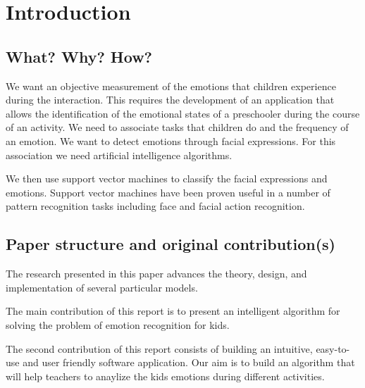 \documentclass[runningheads,a4paper,11pt]{report}
\begin{document}
\tableofcontents

\newpage

\listoftables
\listoffigures

\newpage




\newpage






\chapter{Introduction}
\label{chapter:introduction}

\section{What? Why? How?}
\label{section:what}

We want an objective measurement of the emotions that children experience during the interaction. This requires the development of an application that allows the identification of the emotional states of a preschooler during the course of an activity. We need to associate tasks that children do and the frequency of an emotion.
We want to detect emotions through facial expressions. For this association we need artificial intelligence algorithms.

We then use support vector machines to classify the facial expressions and emotions.
Support vector machines have been proven useful in a number of pattern recognition tasks including face and facial action recognition.

\section{Paper structure and original contribution(s)}
\label{section:structure}

The research presented in this paper advances the theory, design, and implementation of several particular models.

The main contribution of this report is to present an intelligent algorithm for solving the problem of emotion recognition for kids.

The second contribution of this report consists of building an intuitive, easy-to-use and user friendly software application. Our aim is to build an algorithm that will help teachers to anaylize the kids emotions during different activities.
\end{document}
